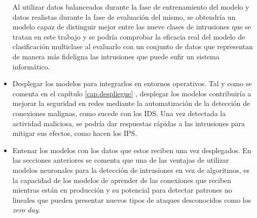 \begin{itemize}
	Al utilizar datos balanceados durante la fase de entrenamiento del modelo y datos realistas durante la fase de evaluación del mismo, se obtendría un modelo capaz de distinguir mejor entre las nueve clases de intrusiones que se tratan en este trabajo y se podría comprobar la eficacia real del modelo de clasificación multiclase al evaluarlo con un conjunto de datos que representan de manera más fideligna las intrusiones que puede sufir un sistema informático.
	
	\item Desplegar los modelos para integrarlos en entornos operativos. Tal y como se comenta en el capítulo \ref{cap.despliegue} , desplegar los modelos contribuiría a mejorar la seguridad en redes mediante la automatización de la detección de conexiones malignas, como sucede con los IDS. Una vez detectada la actividad maliciosa, se podría dar respuestas rápidas a las intrusiones para mitigar sus efectos, como hacen los IPS.
	
	\item Entenar los modelos con los datos que estos reciben una vez desplegados. En las secciones anteriores se comenta que una de las ventajas de utilizar modelos neuronales para la detección de intrusiones en vez de algoritmos, es la capacidad de los modelos de aprender de las conexiones que reciben mientras están en producción y su potencial para detectar patrones no lineales que pueden presentar nuevos tipos de ataques desconocidos como los \textit{zero day}.
\end{itemize}


